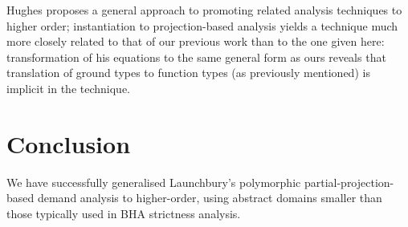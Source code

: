 \documentclass[11pt]{article}
\begin{document}
Hughes \cite{Hug88} proposes a general approach to promoting related
analysis techniques to higher order; instantiation to projection-based
analysis yields a technique much more closely related to that of our
previous work \cite{Dav93b} than to the one given here: transformation
of his equations to the same general form as ours reveals that
translation of ground types to function types (as previously mentioned)
is implicit in the technique.

\section{Conclusion}

We have successfully generalised Launchbury's polymorphic
partial-projection-based demand analysis to higher-order, using abstract
domains smaller than those typically used in BHA strictness analysis.


\end{document}
